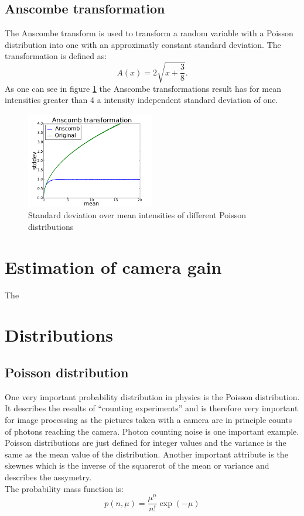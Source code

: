 \subsection{Anscombe transformation}
\label{trafoAnscombe}
The Anscombe transform is used to transform a random variable with a Poisson
distribution into one with an approximatly constant standard deviation. The
transformation is defined as:
\begin{equation}
	A(x) = 2\sqrt{x+\frac{3}{8}}.
\end{equation}
As one can see in figure \ref{anscombe} the Anscombe transformations result has
for mean intensities greater than 4 a intensity independent standard deviation of
one.
\begin{figure}
	\centering
	\includegraphics[width = 0.5\textwidth]{pictures/anscombe.png}
	\caption{Standard deviation over mean intensities of different Poisson
	distributions}
	\label{anscombe}
	
\end{figure}

\section{Estimation of camera gain}
The 

\section{Distributions}
\subsection{Poisson distribution}
One very important probability distribution in physics is the Poisson
distribution. It describes the results of ``counting experiments'' and is
therefore very important for image processing as the pictures taken with a
camera are in principle counts of photons reaching the camera. Photon counting
noise is one important example.\\
Poisson distributions are just defined for integer values and the variance is
the same as the mean value of the distribution. Another important attribute is
the skewnes which is the inverse of the squarerot of the mean or variance and describes the assymetry.\\ 
The probability mass function is:
\begin{equation}
	p(n,\mu) = \frac{\mu^n}{n!}\exp(-\mu)
\end{equation}

